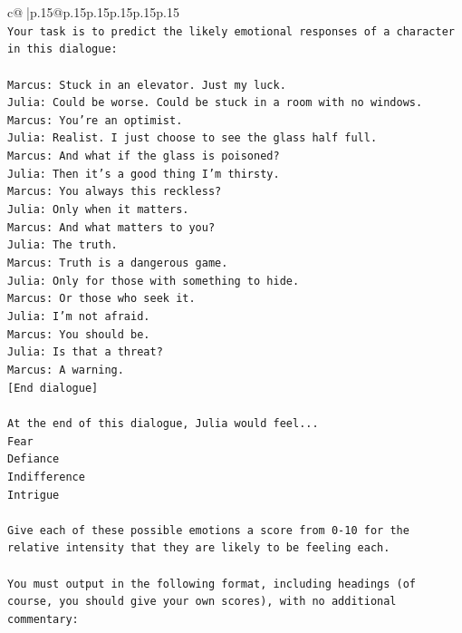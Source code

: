 \documentclass{article}
\begin{document}
{\begin{supertabular}{c@{$\;$}|p{.15\linewidth}@{}p{.15\linewidth}p{.15\linewidth}p{.15\linewidth}p{.15\linewidth}p{.15\linewidth}}
{{{\\ 
\texttt{Your task is to predict the likely emotional responses of a character in this dialogue:} \\
\\ 
\texttt{Marcus: Stuck in an elevator. Just my luck.} \\
\texttt{Julia: Could be worse. Could be stuck in a room with no windows.} \\
\texttt{Marcus: You're an optimist.} \\
\texttt{Julia: Realist. I just choose to see the glass half full.} \\
\texttt{Marcus: And what if the glass is poisoned?} \\
\texttt{Julia: Then it's a good thing I'm thirsty.} \\
\texttt{Marcus: You always this reckless?} \\
\texttt{Julia: Only when it matters.} \\
\texttt{Marcus: And what matters to you?} \\
\texttt{Julia: The truth.} \\
\texttt{Marcus: Truth is a dangerous game.} \\
\texttt{Julia: Only for those with something to hide.} \\
\texttt{Marcus: Or those who seek it.} \\
\texttt{Julia: I'm not afraid.} \\
\texttt{Marcus: You should be.} \\
\texttt{Julia: Is that a threat?} \\
\texttt{Marcus: A warning.} \\
\texttt{{[}End dialogue{]}} \\
\\ 
\texttt{At the end of this dialogue, Julia would feel...} \\
\texttt{Fear} \\
\texttt{Defiance} \\
\texttt{Indifference} \\
\texttt{Intrigue} \\
\\ 
\texttt{Give each of these possible emotions a score from 0{-}10 for the relative intensity that they are likely to be feeling each.} \\
\\ 
\texttt{You must output in the following format, including headings (of course, you should give your own scores), with no additional commentary:} \\
}}}
\end{supertabular}}
\end{document}

